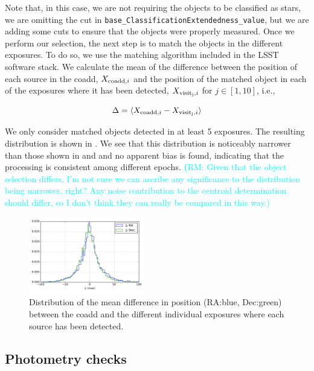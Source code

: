 \documentclass[twocolumn]{aastex62}
\newcommand{\rachel}[1]{{\textcolor{cyan}{{\textbf (RM: #1)}}}}
\begin{document}
Note that, in this case, we are not requiring the objects to be classified as stars, we are omitting the cut in
\texttt{base\_ClassificationExtendedness\_value}, but we are adding some cuts to ensure that the objects were properly measured. Once
we perform our selection, the next step is to match the objects in the different exposures. To do so, we use the matching algorithm
included in the LSST software stack. We calculate the mean of the difference between the position of each source
in the coadd, $X_{{\rm coadd},i}$ and the position of the matched object in each of the exposures where it has been detected, $X_{{\rm visit_{j}},i}$
for $j \in [1,10]$, i.e.,

\begin{equation}
  \Delta = \langle X_{{\rm coadd},i} - X_{{\rm visit_{j}},i} \rangle
\end{equation}

We only consider matched objects detected in at least 5 exposures. The resulting distribution is shown in . We see that this distribution is noticeably narrower than those shown in  and  and no apparent bias is found, indicating that the processing is consistent among different epochs. \rachel{Given that the object selection differs, I'm not sure we can ascribe any significance to the distribution being narrower, right?  Any noise contribution to the centroid determination should differ, so I don't think they can really be compared in this way.}

\begin{figure}
  \centering
  \includegraphics[width=0.45\textwidth]{astrometry_internal_10visits_imsim_undithered}
  \caption{Distribution of the mean difference in position (RA:blue, Dec:green) between the coadd and the different individual exposures
  where each source has been detected.}
  \label{fig:astrometry_internal}
\end{figure}

\subsection{Photometry checks}
\label{sec:photometry_checks}
\end{document}
